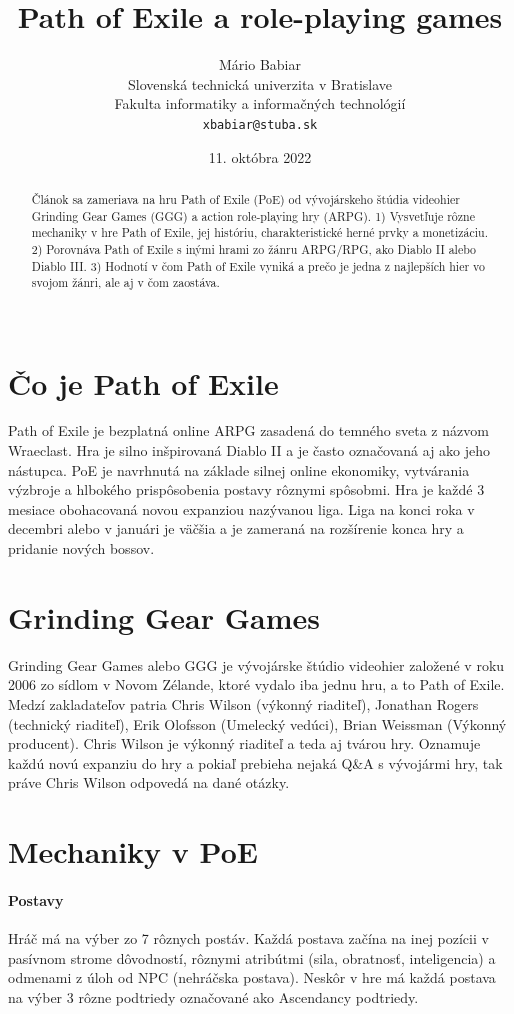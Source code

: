 \documentclass[10pt,oneside,slovak,a4paper]{article}
\title{Path of Exile a role-playing games}
\author{Mário Babiar\\[2pt]
	{\small Slovenská technická univerzita v Bratislave}\\
	{\small Fakulta informatiky a informačných technológií}\\
	{\small \texttt{xbabiar@stuba.sk}}
	}
\date{\small 11. októbra 2022}
\begin{document}
\maketitle

\begin{abstract}
Článok sa zameriava na hru Path of Exile (PoE) od vývojárskeho štúdia videohier Grinding Gear Games (GGG) a action role-playing hry (ARPG). 1) Vysvetľuje rôzne mechaniky v hre Path of Exile, jej históriu, charakteristické herné prvky a monetizáciu. 2) Porovnáva Path of Exile s inými hrami zo žánru ARPG/RPG, ako Diablo II alebo Diablo III. 3) Hodnotí v čom Path of Exile vyniká a prečo je jedna z najlepších hier vo svojom žánri, ale aj v čom zaostáva.\\\\
\end{abstract}
 
\section{Čo je Path of Exile}
Path of Exile je bezplatná online ARPG zasadená do temného sveta z názvom Wraeclast. Hra je silno inšpirovaná Diablo II a je často označovaná aj ako jeho nástupca. PoE je navrhnutá na základe silnej online ekonomiky, vytvárania výzbroje a hlbokého prispôsobenia postavy rôznymi spôsobmi. Hra je každé 3 mesiace obohacovaná novou expanziou nazývanou liga. Liga na konci roka v decembri alebo v januári je väčšia a je zameraná na rozšírenie konca hry a pridanie nových bossov.

\section{Grinding Gear Games}
Grinding Gear Games alebo GGG je vývojárske štúdio videohier založené v roku 2006 zo sídlom v Novom Zélande, ktoré vydalo iba jednu hru, a to Path of Exile. Medzí zakladateľov patria Chris Wilson (výkonný riaditeľ), Jonathan Rogers (technický riaditeľ), Erik Olofsson (Umelecký vedúci), Brian Weissman (Výkonný producent). Chris Wilson je výkonný riaditeľ a teda aj tvárou hry. Oznamuje každú novú expanziu do hry a pokiaľ prebieha nejaká Q\&A s vývojármi hry, tak práve Chris Wilson odpovedá na dané otázky.
\pagebreak

\section{Mechaniky v PoE}
\paragraph{Postavy}
Hráč má na výber zo 7 rôznych postáv. Každá postava začína na inej pozícii v pasívnom strome dôvodností, rôznymi atribútmi (sila, obratnosť, inteligencia) a odmenami z úloh od NPC (nehráčska postava). Neskôr v hre má každá postava na výber 3 rôzne podtriedy označované ako Ascendancy podtriedy.\cite{PoE-offisite-classes}
\end{document}
